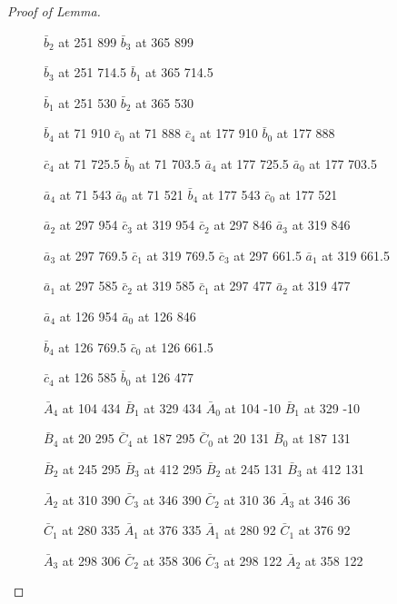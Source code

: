 \documentclass[12pt]{amsart}
\theoremstyle{definition}
\theoremstyle{remark}
\begin{document}
\begin{proof}[Proof of Lemma]
\begin{figure}[p]
\begin{center}
\pinlabel $\bar b_2$ at 251 899
\pinlabel $\bar b_3$ at 365 899

\pinlabel $\bar b_3$ at 251 714.5
\pinlabel $\bar b_1$ at 365 714.5

\pinlabel $\bar b_1$ at 251 530
\pinlabel $\bar b_2$ at 365 530

\pinlabel $\bar b_4$ at 71 910
\pinlabel $\bar c_0$ at 71 888
\pinlabel $\bar c_4$ at 177 910
\pinlabel $\bar b_0$ at 177 888

\pinlabel $\bar c_4$ at 71 725.5
\pinlabel $\bar b_0$ at 71 703.5
\pinlabel $\bar a_4$ at 177 725.5
\pinlabel $\bar a_0$ at 177 703.5

\pinlabel $\bar a_4$ at 71 543
\pinlabel $\bar a_0$ at 71 521
\pinlabel $\bar b_4$ at 177 543
\pinlabel $\bar c_0$ at 177 521

\pinlabel $\bar a_2$ at 297 954
\pinlabel $\bar c_3$ at 319 954
\pinlabel $\bar c_2$ at 297 846
\pinlabel $\bar a_3$ at 319 846

\pinlabel $\bar a_3$ at 297 769.5
\pinlabel $\bar c_1$ at 319 769.5
\pinlabel $\bar c_3$ at 297 661.5
\pinlabel $\bar a_1$ at 319 661.5

\pinlabel $\bar a_1$ at 297 585
\pinlabel $\bar c_2$ at 319 585
\pinlabel $\bar c_1$ at 297 477
\pinlabel $\bar a_2$ at 319 477

\pinlabel $\bar a_4$ at 126 954
\pinlabel $\bar a_0$ at 126 846

\pinlabel $\bar b_4$ at 126 769.5
\pinlabel $\bar c_0$ at 126 661.5

\pinlabel $\bar c_4$ at 126 585
\pinlabel $\bar b_0$ at 126 477

\pinlabel $\bar A_4$ at 104 434
\pinlabel $\bar B_1$ at 329 434
\pinlabel $\bar A_0$ at 104 -10
\pinlabel $\bar B_1$ at 329 -10

\pinlabel $\bar B_4$ at 20 295
\pinlabel $\bar C_4$ at 187 295
\pinlabel $\bar C_0$ at 20 131
\pinlabel $\bar B_0$ at 187 131

\pinlabel $\bar B_2$ at 245 295
\pinlabel $\bar B_3$ at 412 295
\pinlabel $\bar B_2$ at 245 131
\pinlabel $\bar B_3$ at 412 131

\pinlabel $\bar A_2$ at 310 390
\pinlabel $\bar C_3$ at 346 390
\pinlabel $\bar C_2$ at 310 36
\pinlabel $\bar A_3$ at 346 36

\pinlabel $\bar C_1$ at 280 335
\pinlabel $\bar A_1$ at 376 335
\pinlabel $\bar A_1$ at 280 92
\pinlabel $\bar C_1$ at 376 92

\pinlabel $\bar A_3$ at 298 306
\pinlabel $\bar C_2$ at 358 306
\pinlabel $\bar C_3$ at 298 122
\pinlabel $\bar A_2$ at 358 122


\end{center}
\end{figure}
\end{proof}
\end{document}
